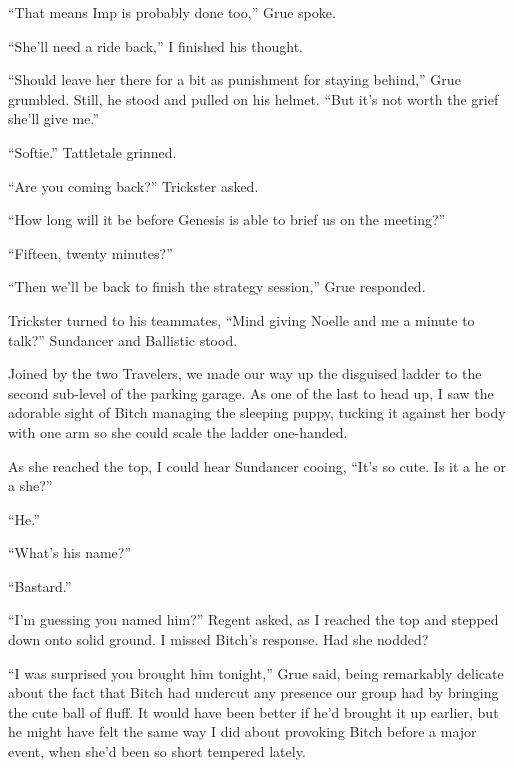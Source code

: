 ``That means Imp is probably done too,'' Grue spoke.



``She'll need a ride back,'' I finished his thought.



``Should leave her there for a bit as punishment for staying behind,'' Grue grumbled.  Still, he stood and pulled on his helmet.  ``But it's not worth the grief she'll give me.''



``Softie.'' Tattletale grinned.



``Are you coming back?'' Trickster asked.



``How long will it be before Genesis is able to brief us on the meeting?''



``Fifteen, twenty minutes?''



``Then we'll be back to finish the strategy session,'' Grue responded.



Trickster turned to his teammates, ``Mind giving Noelle and me a minute to talk?''  Sundancer and Ballistic stood.



Joined by the two Travelers, we made our way up the disguised ladder to the second sub-level of the parking garage.  As one of the last to head up, I saw the adorable sight of Bitch managing the sleeping puppy, tucking it against her body with one arm so she could scale the ladder one-handed.



As she reached the top, I could hear Sundancer cooing, ``It's so cute.  Is it a he or a she?''



``He.''



``What's his name?''



``Bastard.''



``I'm guessing you named him?'' Regent asked, as I reached the top and stepped down onto solid ground.  I missed Bitch's response.  Had she nodded?



``I was surprised you brought him tonight,'' Grue said, being remarkably delicate about the fact that Bitch had undercut any presence our group had by bringing the cute ball of fluff.  It would have been better if he'd brought it up earlier, but he might have felt the same way I did about provoking Bitch before a major event, when she'd been so short tempered lately.




